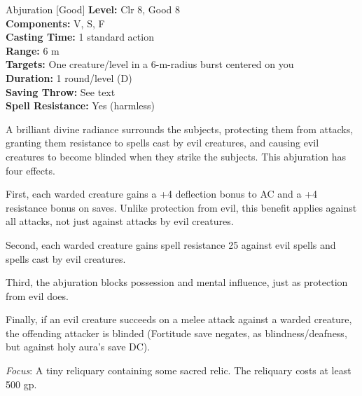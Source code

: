 {Abjuration [Good]}
{
	\textbf{Level:}
	Clr 8, Good 8\\
	\textbf{Components:}
	V, S, F\\
	\textbf{Casting Time:}
	1 standard action\\
	\textbf{Range:}
	6 m\\
	\textbf{Targets:}
	One creature/level in a 6-m-radius burst centered on you\\
	\textbf{Duration:}
	1 round/level (D)\\
	\textbf{Saving Throw:}
	See text\\
	\textbf{Spell Resistance:}
	Yes (harmless)\\
}
{
	A brilliant divine radiance surrounds the subjects, protecting them from attacks, granting them resistance to spells cast by evil creatures, and causing evil creatures to become blinded when they strike the subjects. This abjuration has four effects.

	First, each warded creature gains a +4 deflection bonus to AC and a +4 resistance bonus on saves. Unlike protection from evil, this benefit applies against all attacks, not just against attacks by evil creatures.

	Second, each warded creature gains spell resistance 25 against evil spells and spells cast by evil creatures.

	Third, the abjuration blocks possession and mental influence, just as protection from evil does.

	Finally, if an evil creature succeeds on a melee attack against a warded creature, the offending attacker is blinded (Fortitude save negates, as blindness/deafness, but against holy aura's save DC).

	\textit{Focus}:
	A tiny reliquary containing some sacred relic. The reliquary costs at least 500 gp.

}
